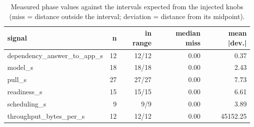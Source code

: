 \begin{table}[t]
\centering\small
\caption{Measured phase values against the intervals expected from the injected knobs (miss = distance outside the interval; deviation = distance from its midpoint).}\label{tab:rq1_fidelity}
\begin{tabular}{lrrrr}
\toprule
signal & n & in range & median miss & mean |dev.| \\
\midrule
dependency\_answer\_to\_app\_s & 12 & 12/12 & 0.00 & 0.37 \\
model\_s & 18 & 18/18 & 0.00 & 2.43 \\
pull\_s & 27 & 27/27 & 0.00 & 7.73 \\
readiness\_s & 15 & 15/15 & 0.00 & 6.61 \\
scheduling\_s & 9 & 9/9 & 0.00 & 3.89 \\
throughput\_bytes\_per\_s & 12 & 12/12 & 0.00 & 45152.25 \\
\bottomrule
\end{tabular}
\end{table}
